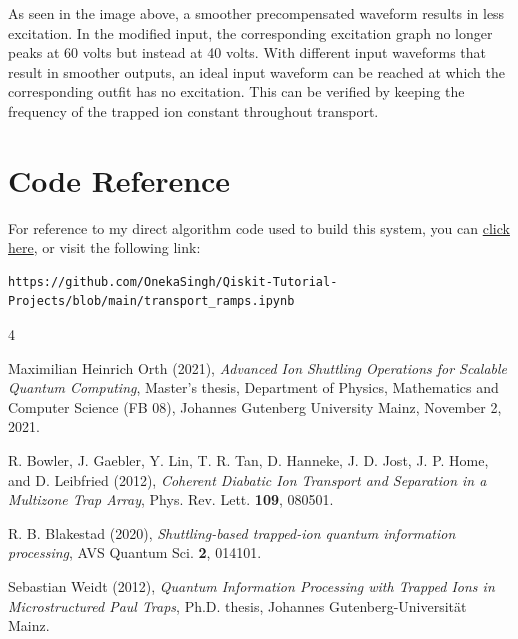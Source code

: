 \documentclass[11pt, a4paper]{article}
\theoremstyle{definition}
\numberwithin{equation}{section}
\begin{document}
As seen in the image above, a smoother precompensated waveform results in less excitation. In the modified input, the corresponding excitation graph no longer peaks at 60 volts but instead at 40 volts. 
With different input waveforms that result in smoother outputs, an ideal input waveform can be reached at which the corresponding outfit has no excitation. This can be verified by keeping the frequency
of the trapped ion constant throughout transport. 

\section{Code Reference}

For reference to my direct algorithm code used to build this system, you can \href{https://github.com/OnekaSingh/Qiskit-Tutorial-Projects/blob/main/transport_ramps.ipynb}{click here}, or visit the following link:
\begin{verbatim}
https://github.com/OnekaSingh/Qiskit-Tutorial-Projects/blob/main/transport_ramps.ipynb
\end{verbatim}

\newpage

\begin{thebibliography}{4}

Maximilian Heinrich Orth (2021), \emph{Advanced Ion Shuttling Operations for Scalable Quantum Computing}, Master's thesis, Department of Physics, Mathematics and Computer Science (FB 08), Johannes Gutenberg University Mainz, November 2, 2021.

R. Bowler, J. Gaebler, Y. Lin, T. R. Tan, D. Hanneke, J. D. Jost, J. P. Home, and D. Leibfried (2012),
\emph{Coherent Diabatic Ion Transport and Separation in a Multizone Trap Array},
Phys. Rev. Lett. \textbf{109}, 080501.

R. B. Blakestad (2020),
\emph{Shuttling-based trapped-ion quantum information processing},
AVS Quantum Sci. \textbf{2}, 014101.

Sebastian Weidt (2012),
\emph{Quantum Information Processing with Trapped Ions in Microstructured Paul Traps},
Ph.D. thesis, Johannes Gutenberg-Universität Mainz.

\end{thebibliography}
\end{document}
